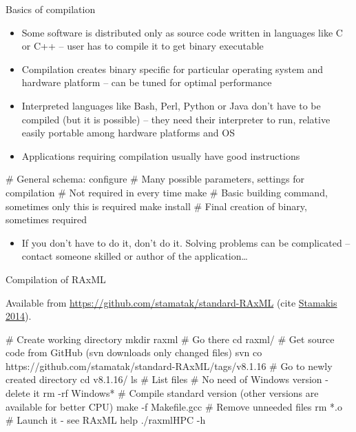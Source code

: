 \documentclass[compress, ucs, xelatex, 11pt, xcolor=svgnames,
  hyperref={
    bookmarks=true,
    unicode=true,
    colorlinks=true,
    pdftitle={Linux, command line and MetaCentrum},
    plainpages=false,
    pdfauthor={Vojtech Zeisek},
    pdfsubject={Course about use of Linux command line, writing shell scripts and using MetaCentrum of CESNET},
    pdfcreator={XeLaTeX},
    pdfkeywords={Linux, GNU, BASH, shell, command line, MetaCentrum},
    linkcolor=Red,
    anchorcolor=Blue,
    citecolor=Purple,
    filecolor=DodgerBlue,
    menucolor=DarkOrchid,
    urlcolor=DeepSkyBlue,
    pdftex},
  url={hyphens, lowtilde} %
  ]{beamer}
\begin{document}
\begin{frame}[fragile]{Basics of compilation}
\begin{itemize}
  \item Some software is distributed only as source code written in languages like C or C++ -- user has to compile it to get binary executable
  \item Compilation creates binary specific for particular operating system and hardware platform -- can be tuned for optimal performance
  \item Interpreted languages like Bash, Perl, Python or Java don't have to be compiled (but it is possible) -- they need their interpreter to run, relative easily portable among hardware platforms and OS
  \item Applications requiring compilation usually have good instructions
\end{itemize}
  \begin{bashcode}
    # General schema:
    configure # Many possible parameters, settings for compilation
              # Not required in every time
    make # Basic building command, sometimes only this is required
    make install # Final creation of binary, sometimes required
  \end{bashcode}
\begin{itemize}
  \item If you don't have to do it, don't do it. Solving problems can be complicated -- contact someone skilled or author of the application\ldots
\end{itemize}
\end{frame}

\begin{frame}[fragile]{Compilation of RAxML}
\begin{footnotesize}
  Available from \url{https://github.com/stamatak/standard-RAxML} (cite \href{https://bioinformatics.oxfordjournals.org/content/30/9/1312.abstract}{Stamakis 2014}).
\end{footnotesize}
  \begin{bashcode}
    # Create working directory
    mkdir raxml
    # Go there
    cd raxml/
    # Get source code from GitHub (svn downloads only changed files)
    svn co https://github.com/stamatak/standard-RAxML/tags/v8.1.16
    # Go to newly created directory
    cd v8.1.16/
    ls # List files
    # No need of Windows version - delete it
    rm -rf Windows*
    # Compile standard version (other versions are available for better CPU)
    make -f Makefile.gcc
    # Remove unneeded files
    rm *.o
    # Launch it - see RAxML help
    ./raxmlHPC -h
  \end{bashcode}
\end{frame}
\end{document}

